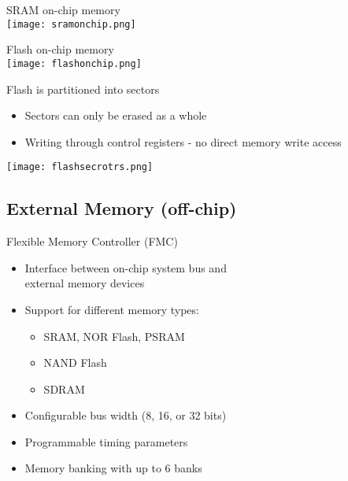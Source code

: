 
\begin{theorem}{SRAM on-chip memory}\\
    \texttt{[image: sramonchip.png]}
\end{theorem}

\begin{theorem}{Flash on-chip memory}\\
    \texttt{[image: flashonchip.png]}
\end{theorem}

\multend

\begin{corollary}{Flash is partitioned into sectors}
    \begin{itemize}
        \item Sectors can only be erased as a whole
        \item Writing through control registers - no direct memory write access
    \end{itemize}
    \texttt{[image: flashsecrotrs.png]}
\end{corollary}



\subsection{External Memory (off-chip)}


\begin{concept}{Flexible Memory Controller (FMC)}
\begin{itemize}
    \item Interface between on-chip system bus and \\ external memory devices
    \item Support for different memory types:
    \begin{itemize}
        \item SRAM, NOR Flash, PSRAM
        \item NAND Flash
        \item SDRAM
    \end{itemize}
    \item Configurable bus width (8, 16, or 32 bits)
    \item Programmable timing parameters
    \item Memory banking with up to 6 banks
\end{itemize}
\end{concept}

